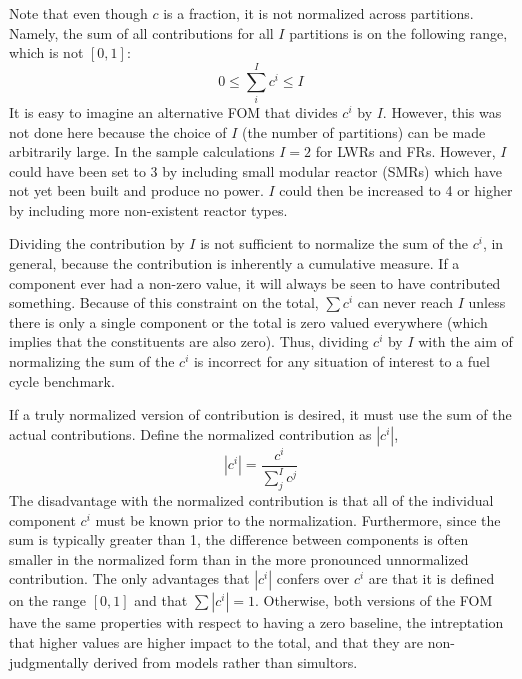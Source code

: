 Note that even though $c$ is a fraction, it is not normalized across 
partitions. Namely, the sum of all contributions for all $I$ partitions
is on the following range, which is not $[0, 1]$:
\begin{equation}
\label{sum-c-range}
0 \le \sum_i^I c^i \le I
\end{equation}
It is easy to imagine an alternative FOM that divides $c^i$ by $I$. However, 
this was not done here because the choice of $I$ (the number of partitions)
can be made arbitrarily large.  In the sample calculations $I=2$ for LWRs and
FRs.  However, $I$ could have been set to 3 by including small modular reactor
(SMRs) which have not yet been built and produce no power.  $I$ could then be 
increased to 4 or higher by including more non-existent reactor types.

Dividing the contribution by $I$ is not sufficient to 
normalize the sum of the $c^i$, in general, because the 
contribution is inherently a cumulative measure. If a component ever had a 
non-zero value, it will always be seen to have contributed something. 
Because of this constraint on the total, $\sum c^i$ can never
reach $I$ unless there is only a single component or the 
total is zero valued everywhere (which implies that the constituents are also 
zero). Thus, dividing $c^i$ by $I$ with the aim of normalizing the 
sum of the $c^i$ is incorrect for any situation of interest to a fuel 
cycle benchmark.

If a truly normalized version of contribution is desired, it must 
use the sum of the actual contributions. Define the normalized contribution 
as $|c^i|$, 
\begin{equation}
\label{norm-ci}
\left|c^i\right| = \frac{c^i}{\sum_j^I c^j}
\end{equation}
The disadvantage with the normalized contribution is that all of the 
individual component $c^i$ must be known prior to the normalization. 
Furthermore, since the sum is typically greater than 1, the difference 
between components is often smaller in the normalized form than in the
more pronounced unnormalized contribution.
The only advantages that $|c^i|$ confers over $c^i$ are that it is defined on 
the range $[0,1]$ and that $\sum |c^i| = 1$. Otherwise, both versions of the FOM
have the same properties with respect to having a zero baseline, the 
intreptation that higher values are higher impact to the total, and that they 
are non-judgmentally derived from models rather than simultors.

